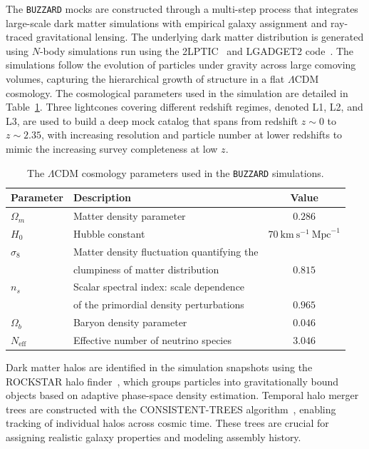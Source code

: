 The \texttt{BUZZARD} mocks are constructed through a multi-step process that integrates large-scale dark matter simulations with empirical galaxy assignment and ray-traced gravitational lensing. The underlying dark matter distribution is generated using $N$-body simulations run using the 2LPT{\small{IC}}~\citep{crocce2006transients} and LGADGET2 code~\citep{springel2005cosmological}. The simulations follow the evolution of particles under gravity across large comoving volumes, capturing the hierarchical growth of structure in a flat $\Lambda$CDM cosmology. The cosmological parameters used in the simulation are detailed in Table~\ref{tab:BUZZARD_cosmology}. Three lightcones covering different redshift regimes, denoted L1, L2, and L3, are used to build a deep mock catalog that spans from redshift $z \sim 0$ to $z \sim 2.35$, with increasing resolution and particle number at lower redshifts to mimic the increasing survey completeness at low $z$.

\begin{table}
    \small
    \centering
    \caption[\texttt{BUZZARD} cosmology]{The $\Lambda$CDM cosmology parameters used in the \texttt{BUZZARD} simulations.}
    \label{tab:BUZZARD_cosmology}
    \begin{tabular}{l l c}
        \hline
        \textbf{Parameter} & \textbf{Description} & \textbf{Value} \\
        \hline
        $\Omega_m$ & Matter density parameter & $0.286$ \\
        $H_0$ & Hubble constant & $70~{\mathrm{km}~\mathrm{s}^{-1}~\mathrm{Mpc}^{-1}}$ \\
        $\sigma_8$ & Matter density fluctuation quantifying the   & \\
        & clumpiness of matter distribution & $0.815$ \\
        $n_s$ & Scalar spectral index: scale dependence & \\
        & of the primordial density perturbations & $0.965$ \\
        $\Omega_b$ & Baryon density parameter & $0.046$ \\
        $N_{\mathrm{eff}}$ & Effective number of neutrino species & $3.046$ \\
        \hline
    \end{tabular}
\end{table}

Dark matter halos are identified in the simulation snapshots using the ROCKSTAR halo finder~\citep{behroozi2012rockstar}, which groups particles into gravitationally bound objects based on adaptive phase-space density estimation. Temporal halo merger trees are constructed with the CONSISTENT-TREES algorithm~\citep{behroozi2012gravitationally}, enabling tracking of individual halos across cosmic time. These trees are crucial for assigning realistic galaxy properties and modeling assembly history.

